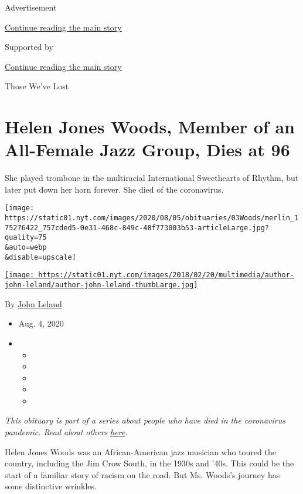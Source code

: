 Advertisement

\protect\hyperlink{after-top}{Continue reading the main story}

Supported by

\protect\hyperlink{after-sponsor}{Continue reading the main story}

Those We've Lost

\hypertarget{helen-jones-woods-member-of-an-all-female-jazz-group-dies-at-96}{%
\section{Helen Jones Woods, Member of an All-Female Jazz Group, Dies at
96}\label{helen-jones-woods-member-of-an-all-female-jazz-group-dies-at-96}}

She played trombone in the multiracial International Sweethearts of
Rhythm, but later put down her horn forever. She died of the
coronavirus.

\texttt{[image: https://static01.nyt.com/images/2020/08/05/obituaries/03Woods/merlin\_175276422\_757cded5-0e31-468c-849c-48f773003b53-articleLarge.jpg?quality=75\\\&auto=webp\\\&disable=upscale]}

\href{https://www.nytimes.com/by/john-leland}{\texttt{[image: https://static01.nyt.com/images/2018/02/20/multimedia/author-john-leland/author-john-leland-thumbLarge.jpg]}}

By \href{https://www.nytimes.com/by/john-leland}{John Leland}

\begin{itemize}
\item
  Aug. 4, 2020
\item
  \begin{itemize}
  \item
  \item
  \item
  \item
  \item
  \end{itemize}
\end{itemize}

\emph{This obituary is part of a series about people who have died in
the coronavirus pandemic. Read about others}
\href{https://www.nytimes.com/interactive/2020/obituaries/people-died-coronavirus-obituaries.html}{\emph{here}}\emph{.}

Helen Jones Woods was an African-American jazz musician who toured the
country, including the Jim Crow South, in the 1930s and '40s. This could
be the start of a familiar story of racism on the road. But Ms. Woods's
journey has some distinctive wrinkles.

